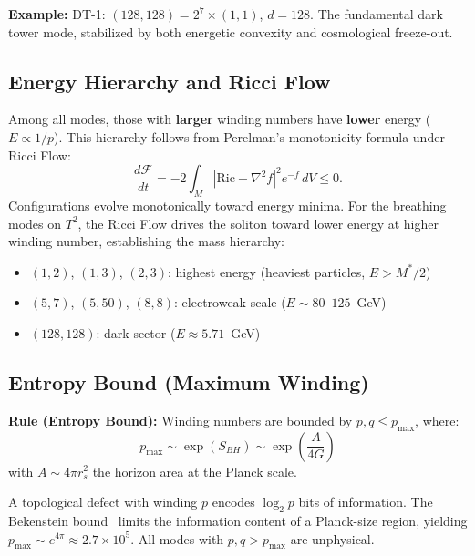 \textbf{Example:} DT-1: $(128,128) = 2^7 \times (1,1)$, $d = 128$.  The fundamental dark tower mode, stabilized by both energetic convexity and cosmological freeze-out.

\subsection{Energy Hierarchy and Ricci Flow}

Among all modes, those with \textbf{larger} winding numbers have \textbf{lower} energy ($E \propto 1/p$).  This hierarchy follows from Perelman's monotonicity formula under Ricci Flow:
\begin{equation}
    \frac{d\mathcal{F}}{dt} = -2\int_M \left|\mathrm{Ric} + \nabla^2 f\right|^2 e^{-f}\, dV \le 0.
\end{equation}
Configurations evolve monotonically toward energy minima.  For the breathing modes on $T^2$, the Ricci Flow drives the soliton toward lower energy at higher winding number, establishing the mass hierarchy:
\begin{itemize}
    \item $(1,2)$, $(1,3)$, $(2,3)$: highest energy (heaviest particles, $E > M^*/2$)
    \item $(5,7)$, $(5,50)$, $(8,8)$: electroweak scale ($E \sim 80$--$125$~GeV)
    \item $(128,128)$: dark sector ($E \approx 5.71$~GeV)
\end{itemize}

\subsection{Entropy Bound (Maximum Winding)}

\begin{mdframed}[backgroundcolor=blue!5]
\textbf{Rule (Entropy Bound):} Winding numbers are bounded by $p, q \le p_{\max}$, where:
\begin{equation}
    p_{\max} \sim \exp(S_{BH}) \sim \exp\!\left( \frac{A}{4G} \right)
\end{equation}
with $A \sim 4\pi r_s^2$ the horizon area at the Planck scale.
\end{mdframed}

A topological defect with winding $p$ encodes $\log_2 p$ bits of information.  The Bekenstein bound~\cite{bekenstein1981} limits the information content of a Planck-size region, yielding $p_{\max} \sim e^{4\pi} \approx 2.7 \times 10^5$.  All modes with $p, q > p_{\max}$ are unphysical.


